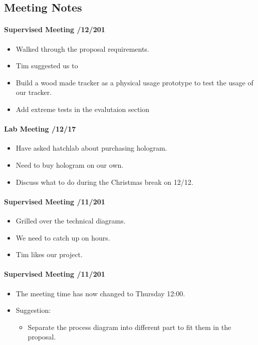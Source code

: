 \documentclass[12pt,a4paper]{article}
\begin{document}
\begin{appendices}
    \section{Meeting Notes}
      \label{appendix:meeting-notes}
      \paragraph{Supervised Meeting /12/201}
      \begin{itemize}
      \item Walked through the proposal requirements.
      \item Tim suggested us to 
        \item Build a wood made tracker as a physical usage prototype to test the usage of our tracker. 
        \item Add extreme tests in the evalutaion section
      \end{itemize}
      
      \paragraph{Lab Meeting /12/17}
      \begin{itemize}
      \item Have asked hatchlab about purchasing hologram.
      \item Need to buy hologram on our own.
      \item Discuss what to do during the Christmas break on 12/12.
      \end{itemize}
      
      \paragraph{Supervised Meeting /11/201}
      \begin{itemize}
      \item Grilled over the technical diagrams.
      \item We need to catch up on hours.
      \item Tim likes our project.
      \end{itemize}
      
      \paragraph{Supervised Meeting /11/201}
      \begin{itemize}
      \item The meeting time has now changed to Thursday 12:00.
      \item Suggestion: 
        \begin{itemize}
          \item Separate the process diagram into different part to fit them in the proposal.
        \end{itemize}
      \end{itemize}
      

\end{appendices}
\end{document}
